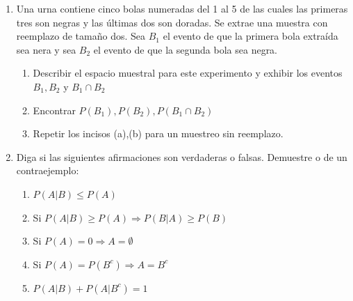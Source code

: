 \documentclass[12pt,a4paper]{report}
\begin{document}
\begin{enumerate}
   \item {
  Una urna contiene cinco bolas numeradas del 1 al 5 de las cuales las primeras tres son negras y las últimas dos son doradas. Se extrae una muestra con reemplazo de tamaño dos. Sea $B_{1}$ el evento de que la primera bola extraída sea nera y sea $B_{2}$ el evento de que la segunda bola sea negra.
\begin{enumerate}[label=\alph*) ]
	\item{Describir el espacio muestral para este experimento y exhibir los eventos $B_{1},B_{2}$ y $B_{1}\cap B_{2}$ \\

	}

	\item{Encontrar $P(B_{1}),P(B_{2}),P(B_{1}\cap B_{2})$\\

	}

	\item{Repetir los incisos (a),(b) para un muestreo sin reemplazo. \\

	}



\end{enumerate}

	}

   \item {
    Diga si las siguientes afirmaciones son verdaderas o falsas. Demuestre o de un contraejemplo:\\
    
    \begin{enumerate}[label=\alph*) ]
	\item{ $P(A|B) \leq P(A)$\\

	}

	\item{Si $P(A|B) \geq P(A) \Rightarrow P(B|A)\geq P(B)$\\

	}

	\item{Si $P(A)=0 \Rightarrow A= \emptyset$ \\

	}
	
	\item{Si $P(A)=P(B^c) \Rightarrow A=B^c$}\\
	
	\item{$P(A|B) + P(A|B^c)=1$}\\
	

\end{enumerate}}
\end{enumerate}
\end{document}
